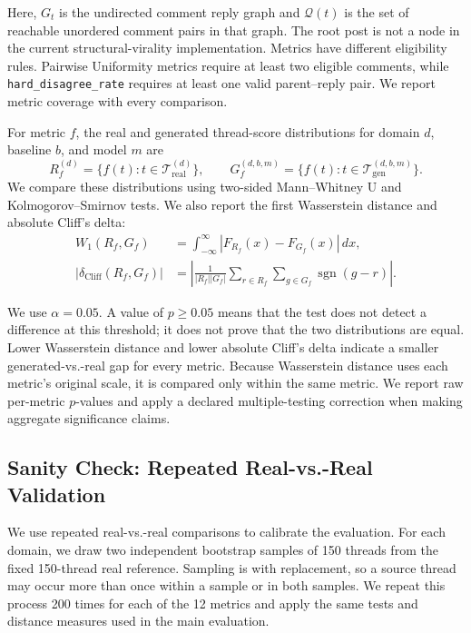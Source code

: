 Here, $G_t$ is the undirected comment reply graph and $\mathcal{Q}(t)$ is the
set of reachable unordered comment pairs in that graph. The root post is not a
node in the current structural-virality implementation. Metrics have different
eligibility rules. Pairwise Uniformity metrics require at least two eligible
comments, while \texttt{hard\_disagree\_rate} requires at least one valid
parent--reply pair. We report metric coverage with every comparison.

For metric $f$, the real and generated thread-score distributions for domain
$d$, baseline $b$, and model $m$ are
\[
R_f^{(d)}=\{f(t):t\in\mathcal{T}_{\mathrm{real}}^{(d)}\},\qquad
G_f^{(d,b,m)}=\{f(t):t\in\mathcal{T}_{\mathrm{gen}}^{(d,b,m)}\}.
\]
We compare these distributions using two-sided Mann--Whitney U and
Kolmogorov--Smirnov tests. We also report the first Wasserstein distance and
absolute Cliff's delta:
\[
\begin{aligned}
W_1(R_f,G_f)
&=\int_{-\infty}^{\infty}|F_{R_f}(x)-F_{G_f}(x)|\,dx,\\
|\delta_{\mathrm{Cliff}}(R_f,G_f)|
&=\left|\frac{1}{|R_f||G_f|}
\sum_{r\in R_f}\sum_{g\in G_f}\operatorname{sgn}(g-r)\right|.
\end{aligned}
\]

We use $\alpha=0.05$. A value of $p\geq0.05$ means that the test does not
detect a difference at this threshold; it does not prove that the two
distributions are equal. Lower Wasserstein distance and lower absolute Cliff's
delta indicate a smaller generated-vs.-real gap for every metric. Because
Wasserstein distance uses each metric's original scale, it is compared only
within the same metric. We report raw per-metric $p$-values and apply a declared
multiple-testing correction when making aggregate significance claims.

\subsection{Sanity Check: Repeated Real-vs.-Real Validation}
\label{sec:real_real_sanity}

We use repeated real-vs.-real comparisons to calibrate the evaluation. For
each domain, we draw two independent bootstrap samples of 150 threads from the
fixed 150-thread real reference. Sampling is with replacement, so a source
thread may occur more than once within a sample or in both samples. We repeat
this process 200 times for each of the 12 metrics and apply the same tests and
distance measures used in the main evaluation.

